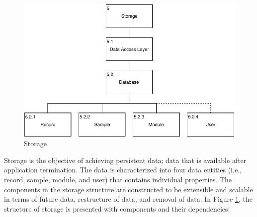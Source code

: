 \begin{figure}
    \centering
    \includegraphics[scale=0.7]{images/Storage.pdf}
    \caption{Storage}
    \label{fig:hta_storage}
\end{figure}

Storage is the objective of achieving persistent data; data that is available after application termination. The data is characterized into four data entities (i.e., record, sample, module, and user) that contains individual properties.  The components in the storage structure are constructed to be extensible and scalable in terms of future data, restructure of data, and removal of data.  In Figure \ref{fig:hta_storage}, the structure of storage is presented with components and their dependencies: 

